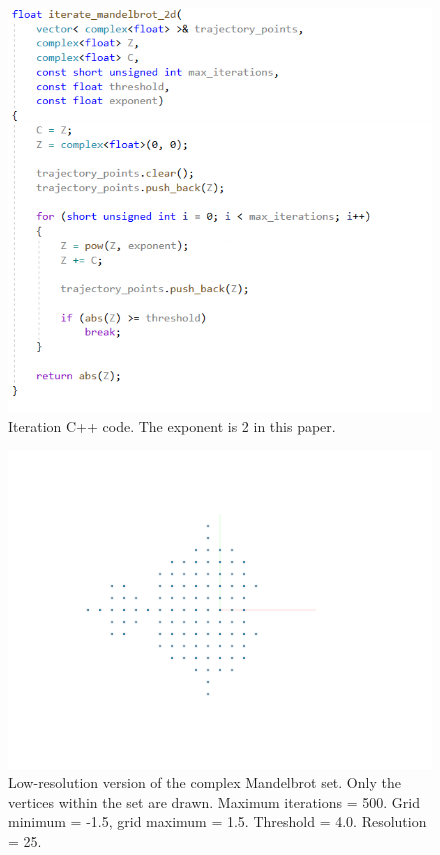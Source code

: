 \documentclass[12pt]{article}
\begin{document}
\begin{figure} 
\centering
  \includegraphics[width = 5 in]{code1.png}	
  \caption{Iteration C++ code.
The exponent is 2 in this paper.
}
\end{figure}

\begin{figure} 
\centering
  \includegraphics[width = 5 in]{set1.png}	
  \caption{Low-resolution version of the complex Mandelbrot set.
Only the vertices within the set are drawn.
Maximum iterations = 500.
Grid minimum = -1.5, grid maximum = 1.5.
Threshold = 4.0.
Resolution = 25.
}
\end{figure}
\end{document}
